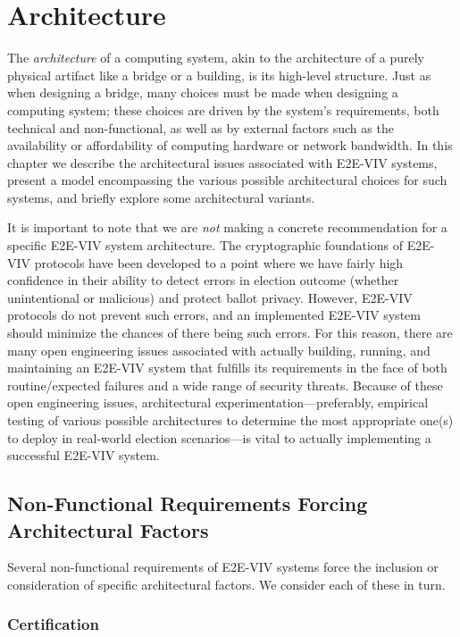 \chapter{Architecture}
\label{chapter:architecture}

The \emph{architecture} of a computing system, akin to the
architecture of a purely physical artifact like a bridge or a
building, is its high-level structure. Just as when designing a
bridge, many choices must be made when designing a computing system;
these choices are driven by the system's requirements, both technical
and non-functional, as well as by external factors such as the
availability or affordability of computing hardware or network
bandwidth. In this chapter we describe the architectural issues
associated with E2E-VIV systems, present a model encompassing the
various possible architectural choices for such systems, and briefly
explore some architectural variants.

It is important to note that we are \emph{not} making a concrete
recommendation for a specific E2E-VIV system architecture. The
cryptographic foundations of E2E-VIV protocols have been developed to
a point where we have fairly high confidence in their ability to
detect errors in election outcome (whether unintentional or malicious)
and protect ballot privacy.  However, E2E-VIV protocols do not prevent
such errors, and an implemented E2E-VIV system should minimize the
chances of there being such errors. For this reason, there are many
open engineering issues associated with actually building, running,
and maintaining an E2E-VIV system that fulfills its requirements in
the face of both routine/expected failures and a wide range of
security threats. Because of these open engineering issues,
architectural experimentation---preferably, empirical testing of
various possible architectures to determine the most appropriate
one(s) to deploy in real-world election scenarios---is vital to
actually implementing a successful E2E-VIV system.

\section{Non-Functional Requirements Forcing Architectural Factors}

Several non-functional requirements of E2E-VIV systems force the
inclusion or consideration of specific architectural factors. We
consider each of these in turn.

\subsection{Certification}

